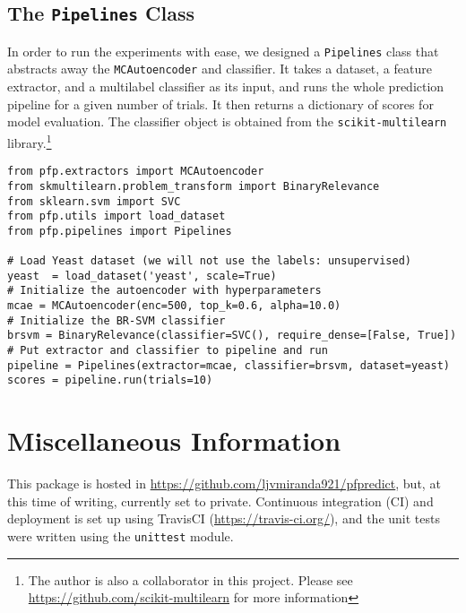 \subsection{The \texttt{Pipelines} Class}

\par In order to run the experiments with ease, we designed a
\texttt{Pipelines} class that abstracts away the \texttt{MCAutoencoder} and
classifier. It takes a dataset, a feature extractor, and a multilabel
classifier as its input, and runs the whole prediction pipeline for a given
number of trials. It then returns a dictionary of scores for model evaluation.
The classifier object is obtained from the \texttt{scikit-multilearn}
library.\footnote{The author is also a collaborator in this project. Please see
\url{https://github.com/scikit-multilearn} for more information}

\begin{lstlisting}[style=mypython, caption=Minimal example for the prediction
pipeline]
from pfp.extractors import MCAutoencoder
from skmultilearn.problem_transform import BinaryRelevance
from sklearn.svm import SVC
from pfp.utils import load_dataset
from pfp.pipelines import Pipelines

# Load Yeast dataset (we will not use the labels: unsupervised)
yeast  = load_dataset('yeast', scale=True)
# Initialize the autoencoder with hyperparameters
mcae = MCAutoencoder(enc=500, top_k=0.6, alpha=10.0)
# Initialize the BR-SVM classifier
brsvm = BinaryRelevance(classifier=SVC(), require_dense=[False, True])
# Put extractor and classifier to pipeline and run
pipeline = Pipelines(extractor=mcae, classifier=brsvm, dataset=yeast)
scores = pipeline.run(trials=10)
\end{lstlisting}

\section{Miscellaneous Information}

\par This package is hosted in
\url{https://github.com/ljvmiranda921/pfpredict}, but, at this time of writing,
currently set to private. Continuous integration (CI) and deployment is set up
using TravisCI (\url{https://travis-ci.org/}), and the unit tests were written
using the \texttt{unittest} module.

